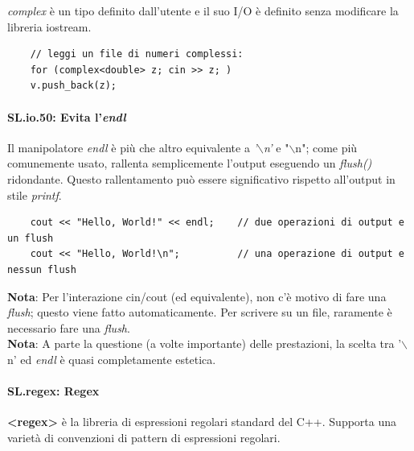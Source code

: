 \textsf{\small \emph{complex} è un tipo definito dall'utente e il suo I/O è definito senza modificare la libreria iostream.} \\

\begin{lstlisting}
	// leggi un file di numeri complessi:
	for (complex<double> z; cin >> z; )
	v.push_back(z);
\end{lstlisting}

\paragraph{SL.io.50: Evita l'\emph{endl}}

\textsf{\small Il manipolatore \emph{endl} è più che altro equivalente a \emph{'$\backslash$n'} e "$\backslash$n"; come più comunemente usato, rallenta semplicemente l'output eseguendo un \emph{flush()} ridondante. Questo rallentamento può essere significativo rispetto all'output in stile \emph{printf}.} \\

\begin{lstlisting}
	cout << "Hello, World!" << endl;    // due operazioni di output e un flush
	cout << "Hello, World!\n";          // una operazione di output e nessun flush
\end{lstlisting}

\textsf{\small \textbf{Nota}: Per l'interazione cin/cout (ed equivalente), non c'è motivo di fare una \emph{flush}; questo viene fatto automaticamente. Per scrivere su un file, raramente è necessario fare una \emph{flush}.} \\

\textsf{\small \textbf{Nota}: A parte la questione (a volte importante) delle prestazioni, la scelta tra '$\backslash$n' ed \emph{endl} è quasi completamente estetica.} \\


\newpage

\paragraph{SL.regex: Regex}

\textsf{\small \textbf{<regex>} è la libreria di espressioni regolari standard del C++. Supporta una varietà di convenzioni di pattern di espressioni regolari.} \\


